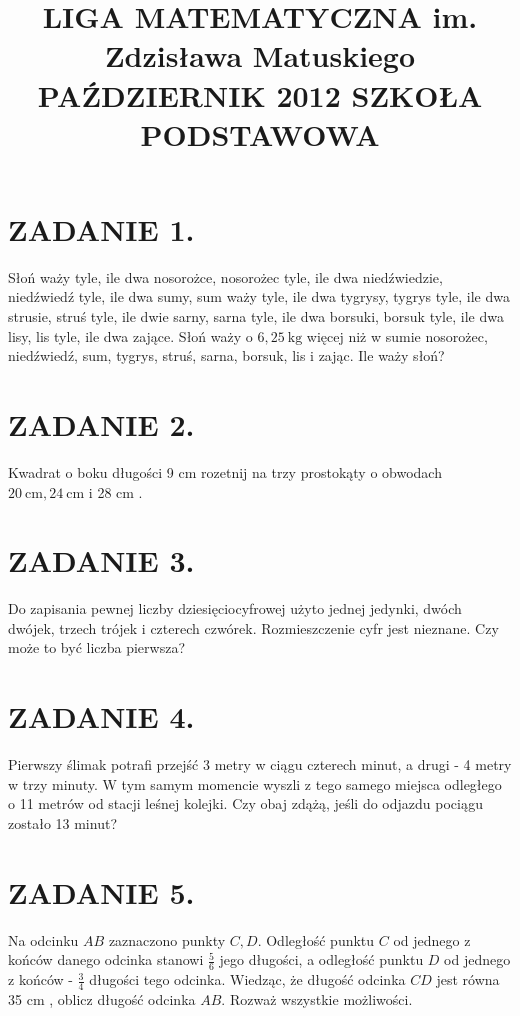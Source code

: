\documentclass[10pt]{article}
\title{LIGA MATEMATYCZNA im. Zdzisława Matuskiego \\
 PAŹDZIERNIK 2012 SZKOŁA PODSTAWOWA }
\author{}
\date{}
\begin{document}
\maketitle
\section*{ZADANIE 1.}
Słoń waży tyle, ile dwa nosorożce, nosorożec tyle, ile dwa niedźwiedzie, niedźwiedź tyle, ile dwa sumy, sum waży tyle, ile dwa tygrysy, tygrys tyle, ile dwa strusie, struś tyle, ile dwie sarny, sarna tyle, ile dwa borsuki, borsuk tyle, ile dwa lisy, lis tyle, ile dwa zające. Słoń waży o \(6,25 \mathrm{~kg}\) więcej niż w sumie nosorożec, niedźwiedź, sum, tygrys, struś, sarna, borsuk, lis i zając. Ile waży słoń?

\section*{ZADANIE 2.}
Kwadrat o boku długości 9 cm rozetnij na trzy prostokąty o obwodach \(20 \mathrm{~cm}, 24 \mathrm{~cm}\) i 28 cm .

\section*{ZADANIE 3.}
Do zapisania pewnej liczby dziesięciocyfrowej użyto jednej jedynki, dwóch dwójek, trzech trójek i czterech czwórek. Rozmieszczenie cyfr jest nieznane. Czy może to być liczba pierwsza?

\section*{ZADANIE 4.}
Pierwszy ślimak potrafi przejść 3 metry w ciągu czterech minut, a drugi - 4 metry w trzy minuty. W tym samym momencie wyszli z tego samego miejsca odległego o 11 metrów od stacji leśnej kolejki. Czy obaj zdążą, jeśli do odjazdu pociągu zostało 13 minut?

\section*{ZADANIE 5.}
Na odcinku \(A B\) zaznaczono punkty \(C, D\). Odległość punktu \(C\) od jednego z końców danego odcinka stanowi \(\frac{5}{6}\) jego długości, a odległość punktu \(D\) od jednego z końców - \(\frac{3}{4}\) długości tego odcinka. Wiedząc, że długość odcinka \(C D\) jest równa 35 cm , oblicz długość odcinka \(A B\). Rozważ wszystkie możliwości.
\end{document}
